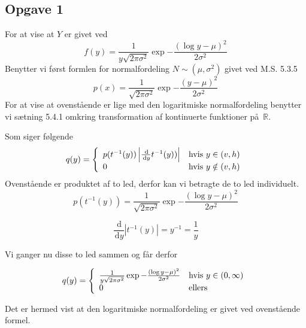 \subsection*{Opgave 1}

\newcommand{\ud}{\, \mathrm{d}}

For at vise at $Y$ er givet ved
\[
 f(y) = \frac{1}{y \sqrt{2\pi \sigma^{2}}} \exp{-\frac{(\log y - \mu)^{2}}{2\sigma^{2}}}
\]
Benytter vi f\o rst formlen for normalfordeling $N \sim (\mu,
\sigma^{2})$ givet ved M.S. 5.3.5
\[
p(x) = \frac{1}{\sqrt{2\pi\sigma^2}}\exp{-\frac{(y - \mu)^{2}}{2\sigma^{2}}}
\]
For at vise at ovenst\aa ende er lige med den logaritmiske
normalfordeling benytter vi s\ae tning 5.4.1 omkring transformation af
kontinuerte funktioner p\aa\ $\mathbb{R}$.

Som siger f\o lgende
\[
q(y) = \left\{
\begin{array}{l l}
 p(t^{-1}(y))\left| \frac{\ud}{\ud y} t^{-1}(y)) \right| & \textrm{hvis } y \in (v,h) \\
 0 & \textrm{hvis } y \notin (v,h)
\end{array}
\right.
\]
Ovenst\aa ende er produktet af to led, derfor kan vi betragte de to
led individuelt.
\[
p(t^{-1}(y)) = \frac{1}{\sqrt{2\pi\sigma^{2}}} \exp{-\frac{(\log y - \mu)^{2}}{2\sigma^{2}}}
\]

\[
\frac{\ud}{\ud y}\left| t^{-1}(y) \right| = y^{-1} = \frac{1}{y}
\]

Vi ganger nu disse to led sammen og f\aa r derfor

\[
q(y) = \left\{
\begin{array}{l l}
\frac{1}{y \sqrt{2\pi\sigma^{2}}} \exp{-\frac{(\log y - \mu)^{2}}{2\sigma^{2}}} & \textrm{hvis } y \in (0, \infty) \\ %
0 & \textrm{ellers }
\end{array}
\right.
\]

Det er hermed vist at den logaritmiske normalfordeling er givet ved ovenst\aa ende formel.

